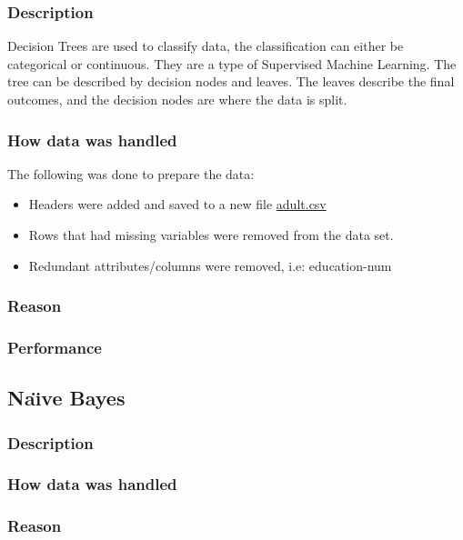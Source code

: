\documentclass[12pt]{article}
\begin{document}
	\subsubsection{Description}
	
	Decision Trees are used to classify data, the classification can either be categorical or continuous. They are a type of Supervised Machine Learning. The tree can be described by decision nodes and leaves. The leaves describe the final outcomes, and the decision nodes are where the data is split\cite{decision-tree-explanation}.
	
	\subsubsection{How data was handled}
	
	The following was done to prepare the data:
	\begin{itemize}
		\item Headers were added and saved to a new file \href{run:../data/adult.csv}{adult.csv}
		\item Rows that had missing variables were removed from the data set.
		\item Redundant attributes/columns were removed, i.e: education-num
	\end{itemize}
	
	\subsubsection{Reason}
	\subsubsection{Performance}
	\newpage
	
	
	
	\subsection{Na\"{\i}ve Bayes}
	\subsubsection{Description}
	\subsubsection{How data was handled}
	\subsubsection{Reason}
\end{document}
